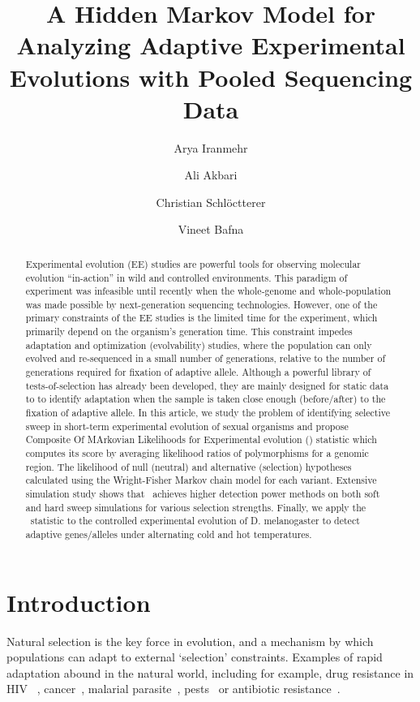 \documentclass[11pt]{article}
\title{A Hidden Markov Model for Analyzing Adaptive Experimental Evolutions with Pooled Sequencing Data}
\author[1]{Arya Iranmehr}
\author[1]{Ali Akbari}
\author[2]{Christian Schl\"{o}ctterer}
\author[3]{Vineet Bafna}
\affil[1]{\footnotesize Electrical and Computer Engineering, University of California, San Diego, La Jolla, CA 92093, USA.}
\affil[2]{\footnotesize Institut für Populationsgenetik, Vetmeduni, Vienna, Austria.}
\affil[3]{\footnotesize Computer Science \& Engineering, University of California, San Diego, La Jolla, CA 92093, USA}
\date{}
\def\comale{\text{COMALE }}
\begin{document}
\maketitle
\begin{abstract}
  Experimental evolution (EE) studies are powerful tools for observing
  molecular evolution ``in-action'' in wild and controlled
  environments. This paradigm of experiment was infeasible until
  recently when the whole-genome and whole-population was made
  possible by next-generation sequencing technologies.  However, one
  of the primary constraints of the EE studies is the limited time for
  the experiment, which primarily depend on the organism's generation
  time. This constraint impedes adaptation and optimization
  (evolvability) studies, where the population can only evolved and
  re-sequenced in a small number of generations, relative to the
  number of generations required for fixation of adaptive allele.
  Although a powerful library of tests-of-selection has already been
  developed, they are mainly designed for static data to to identify
  adaptation when the sample is taken close enough (before/after) to
  the fixation of adaptive allele.  In this article, we study the
  problem of identifying selective sweep in short-term experimental
  evolution of sexual organisms and propose Composite Of MArkovian
  Likelihoods for Experimental evolution (\comale) statistic which
  computes its score by averaging likelihood ratios of polymorphisms
  for a genomic region.  The likelihood of null (neutral) and
  alternative (selection) hypotheses calculated using the
  Wright-Fisher Markov chain model for each variant. Extensive
  simulation study shows that \comale\ achieves higher detection power
  methods on both soft and hard sweep simulations for various
  selection strengths.  Finally, we apply the \comale\ statistic to
  the controlled experimental evolution of D. melanogaster to detect
  adaptive genes/alleles under alternating cold and hot temperatures.
\end{abstract}



\section{Introduction}

Natural selection is the key force in evolution, and a mechanism by
which populations can adapt to external `selection'
constraints. Examples of rapid adaptation abound in the natural world,
including for example, drug resistance in HIV ~\cite{Feder2016More},
cancer~\cite{gottesman2002mechanisms,zahreddine2013mechanisms},
malarial parasite~\cite{ariey2014molecular,nair2007recurrent},
pests~\cite{daborn2001ddt} or antibiotic
resistance~\cite{spellberg2008epidemic}.  
\end{document}

